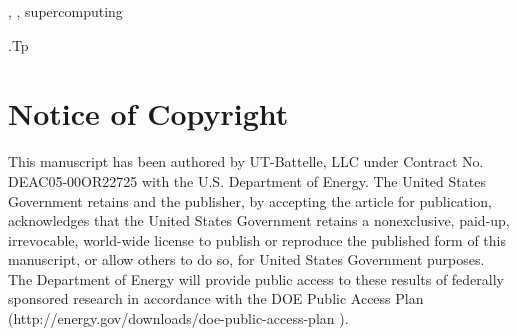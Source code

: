 \documentclass{elsart}
\begin{document}
\begin{frontmatter}
\begin{abstract}

\end{abstract}

\begin{keyword}
\sep 
\sep 
supercomputing

\vspace{1ex}

.Tp %

\end{keyword}

\end{frontmatter}

\section{Notice of Copyright}\label{notice-of-copyright}

This manuscript has been authored by UT-Battelle, LLC under Contract No.
DEAC05-00OR22725 with the U.S. Department of Energy. The United States
Government retains and the publisher, by accepting the article for
publication, acknowledges that the United States Government retains a
nonexclusive, paid-up, irrevocable, world-wide license to publish or
reproduce the published form of this manuscript, or allow others to do
so, for United States Government purposes. The Department of Energy will
provide public access to these results of federally sponsored research
in accordance with the DOE Public Access Plan
(http://energy.gov/downloads/doe-public-access-plan ).






\end{document}
